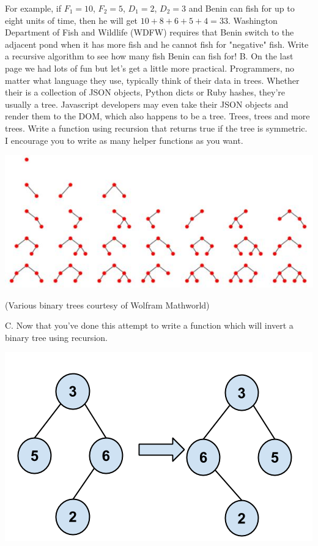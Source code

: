 \documentclass[12pt]{article}
\begin{document}
For example, if $F_1 = 10$, $F_2 = 5$, $D_1 = 2$, $D_2 = 3$ and Benin can fish for up to eight units of time, then he will get $10 + 8 + 6 + 5 + 4 = 33$.
Washington Department of Fish and Wildlife (WDFW) requires that Benin switch to the adjacent pond when it has more fish and he cannot fish for "negative" fish.
Write a recursive algorithm to see how many fish Benin can fish for!
\newpage
\noindent B. On the last page we had lots of fun but let's get a little more practical. Programmers, no matter what language they use, typically think of their data in trees. Whether their is a collection of JSON objects, Python dicts or Ruby hashes, they're usually a tree. Javascript developers may even take their JSON objects and render them to the DOM, which also happens to be a tree. Trees, trees and more trees. Write a function using recursion that returns true if the tree is symmetric. I encourage you to write as many helper functions as you want.\\
\centerline{\includegraphics[scale = 0.5]{binarytree.jpg}}
\centerline{(Various binary trees courtesy of Wolfram Mathworld)}
\newpage
\noindent C. Now that you've done this attempt to write a function which will invert a binary tree using recursion.\\
\centerline{\includegraphics[scale = 0.4]{invertbtree.png}}
\end{document}
